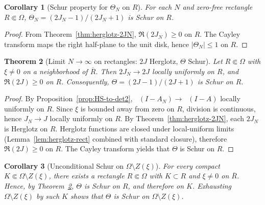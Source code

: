 \documentclass[11pt]{article}
\newtheorem{theorem}{Theorem}
\newtheorem{corollary}[theorem]{Corollary}
\theoremstyle{definition}
\theoremstyle{remark}
\DeclareMathOperator{\dettwo}{det_2}
\begin{document}
\begin{corollary}[Schur property for \(\Theta_N\) on \(R\)]\label{cor:ThetaN-Schur-R}
For each \(N\) and zero-free rectangle \(R\Subset\Omega\), \(\Theta_N=(2J_N-1)/(2J_N+1)\) is Schur on \(R\).
\end{corollary}
\begin{proof}
From Theorem~\ref{thm:herglotz-2JN}, \(\Re(2J_N)\ge 0\) on \(R\). The Cayley transform maps the right half-plane to the unit disk, hence \(|\Theta_N|\le 1\) on \(R\).
\end{proof}

\begin{theorem}[Limit \(N\to\infty\) on rectangles: \(2J\) Herglotz, \(\Theta\) Schur]\label{thm:limit-rect}
Let \(R\Subset\Omega\) with \(\xi\neq 0\) on a neighborhood of \(\overline R\). Then \(2J_N\to 2J\) locally uniformly on \(R\), and \(\Re(2J)\ge 0\) on \(R\). Consequently, \(\Theta=(2J-1)/(2J+1)\) is Schur on \(R\).
\end{theorem}
\begin{proof}
By Proposition~\ref{prop:HS-to-det2}, \(\dettwo(I-A_N)\to \dettwo(I-A)\) locally uniformly on \(R\). Since \(\xi\) is bounded away from zero on \(R\), division is continuous, hence \(J_N\to J\) locally uniformly on \(R\). By Theorem~\ref{thm:herglotz-2JN}, each \(2J_N\) is Herglotz on \(R\). Herglotz functions are closed under local-uniform limits (Lemma~\ref{lem:herglotz-rect} combined with standard closure), therefore \(\Re(2J)\ge 0\) on \(R\). The Cayley transform yields that \(\Theta\) is Schur on \(R\).
\end{proof}
\begin{corollary}[Unconditional Schur on \(\Omega\setminus Z(\xi)\)]\label{cor:Schur-off-zeros}
For every compact \(K\Subset \Omega\setminus Z(\xi)\), there exists a rectangle \(R\Subset\Omega\) with \(K\subset R\) and \(\xi\neq 0\) on \(\overline R\). Hence, by Theorem~\ref{thm:limit-rect}, \(\Theta\) is Schur on \(R\), and therefore on \(K\). Exhausting \(\Omega\setminus Z(\xi)\) by such \(K\) shows that \(\Theta\) is Schur on \(\Omega\setminus Z(\xi)\).
\end{corollary}
\end{document}
